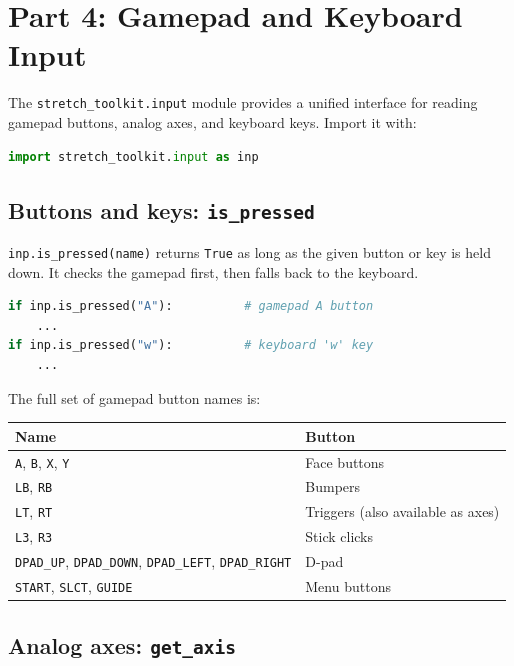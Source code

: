 \documentclass[11pt,a4paper]{article}
\begin{document}
\section{Part 4: Gamepad and Keyboard Input}

The \texttt{stretch\_toolkit.input} module provides a unified interface for reading gamepad buttons, analog axes, and keyboard keys. Import it with:

\begin{lstlisting}[language=Python]
import stretch_toolkit.input as inp
\end{lstlisting}

\subsection*{Buttons and keys: \texttt{is\_pressed}}

\texttt{inp.is\_pressed(name)} returns \texttt{True} as long as the given button or key is held down. It checks the gamepad first, then falls back to the keyboard.

\begin{lstlisting}[language=Python]
if inp.is_pressed("A"):          # gamepad A button
    ...
if inp.is_pressed("w"):          # keyboard 'w' key
    ...
\end{lstlisting}

The full set of gamepad button names is:

\begin{center}
\begin{tabular}{|l|l|}
\hline
\textbf{Name} & \textbf{Button} \\
\hline
\texttt{A}, \texttt{B}, \texttt{X}, \texttt{Y} & Face buttons \\
\texttt{LB}, \texttt{RB} & Bumpers \\
\texttt{LT}, \texttt{RT} & Triggers (also available as axes) \\
\texttt{L3}, \texttt{R3} & Stick clicks \\
\texttt{DPAD\_UP}, \texttt{DPAD\_DOWN}, \texttt{DPAD\_LEFT}, \texttt{DPAD\_RIGHT} & D-pad \\
\texttt{START}, \texttt{SLCT}, \texttt{GUIDE} & Menu buttons \\
\hline
\end{tabular}
\end{center}

\subsection*{Analog axes: \texttt{get\_axis}}
\end{document}
